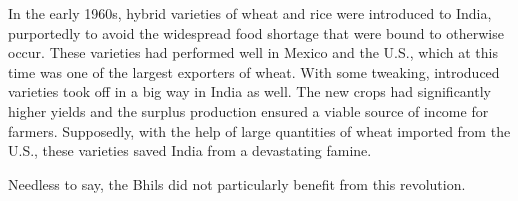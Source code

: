 \documentclass[report.tex]{subfiles}
\begin{document}
In the early 1960s, hybrid varieties of wheat and rice were introduced to India, purportedly to avoid the widespread food shortage that were bound to otherwise occur. These varieties had performed well in Mexico and the U.S., which at this time was one of the largest exporters of wheat. With some tweaking, introduced varieties took off in a big way in India as well. The new crops had significantly higher yields and the surplus production ensured a viable source of income for farmers. Supposedly, with the help of large quantities of wheat imported from the U.S., these varieties saved India from a devastating famine.

Needless to say, the Bhils did not particularly benefit from this revolution.
\end{document}
